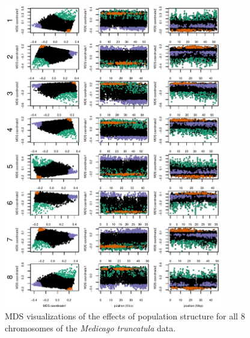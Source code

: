 \documentclass[11pt, oneside]{article}   	%
\begin{document}
\begin{figure}
    \begin{center}
       \includegraphics[width=0.85\textwidth]{FigS_Together_MDS_plot_allchr}
    \end{center}
    \caption{
        MDS visualizations of the effects of population structure for all 8 chromosomes of the \textit{Medicago truncatula} data.
        \label{sfig:mds_medicago_allchr}
    }
\end{figure}
\end{document}
